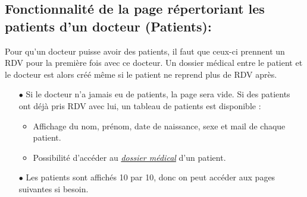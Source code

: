 \documentclass[a4paper]{report}
\begin{document}
\subsection{{Fonctionnalité de la page répertoriant les patients d'un docteur (Patients)}:}\label{patients}
Pour qu'un docteur puisse avoir des patients, il faut que ceux-ci prennent un RDV pour la première fois avec ce docteur. Un dossier médical entre le patient et le docteur
est alors créé même si le patient ne reprend plus de RDV après.
\begin{itemize}
    \item[$\bullet$] Si le docteur n'a jamais eu de patients, la page sera vide. Si des patients ont déjà pris RDV avec lui, un tableau de patients est disponible :
    \begin{itemize}
        \item Affichage du nom, prénom, date de naissance, sexe et mail de chaque patient.
        \item Possibilité d'accéder au \textit{\hyperref[dossier médical]{dossier médical}} d'un patient.
    \end{itemize}
    \item[$\bullet$] Les patients sont affichés 10 par 10, donc on peut accéder aux pages suivantes si besoin.
\end{itemize}
\vspace{3mm}
    
\end{document}
